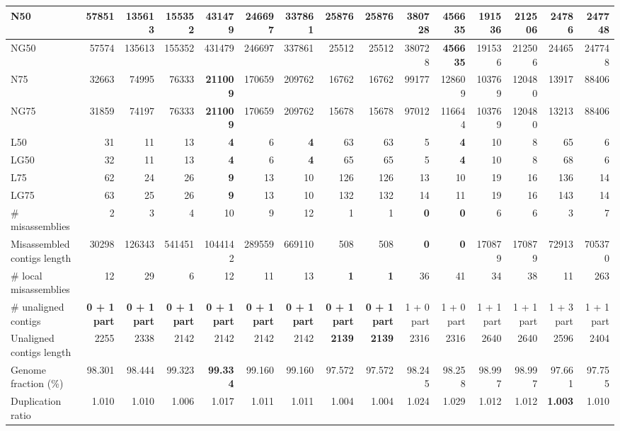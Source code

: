\documentclass[12pt,a4paper]{article}
\begin{document}
\begin{table}[ht]
\begin{center}
\begin{tabular}{|l*{14}{|r}|}
N50 & 57851 & 135613 & 155352 & 431479 & 246697 & 337861 & 25876 & 25876 & 380728 & {\bf 456635} & 191536 & 212506 & 24786 & 247748 \\ \hline
NG50 & 57574 & 135613 & 155352 & 431479 & 246697 & 337861 & 25512 & 25512 & 380728 & {\bf 456635} & 191536 & 212506 & 24465 & 247748 \\ \hline
N75 & 32663 & 74995 & 76333 & {\bf 211009} & 170659 & 209762 & 16762 & 16762 & 99177 & 128609 & 103769 & 120480 & 13917 & 88406 \\ \hline
NG75 & 31859 & 74197 & 76333 & {\bf 211009} & 170659 & 209762 & 15678 & 15678 & 97012 & 116644 & 103769 & 120480 & 13213 & 88406 \\ \hline
L50 & 31 & 11 & 13 & {\bf 4} & 6 & {\bf 4} & 63 & 63 & 5 & {\bf 4} & 10 & 8 & 65 & 6 \\ \hline
LG50 & 32 & 11 & 13 & {\bf 4} & 6 & {\bf 4} & 65 & 65 & 5 & {\bf 4} & 10 & 8 & 68 & 6 \\ \hline
L75 & 62 & 24 & 26 & {\bf 9} & 13 & 10 & 126 & 126 & 13 & 10 & 19 & 16 & 136 & 14 \\ \hline
LG75 & 63 & 25 & 26 & {\bf 9} & 13 & 10 & 132 & 132 & 14 & 11 & 19 & 16 & 143 & 14 \\ \hline
\# misassemblies & 2 & 3 & 4 & 10 & 9 & 12 & 1 & 1 & {\bf 0} & {\bf 0} & 6 & 6 & 3 & 7 \\ \hline
Misassembled contigs length & 30298 & 126343 & 541451 & 1044142 & 289559 & 669110 & 508 & 508 & {\bf 0} & {\bf 0} & 170879 & 170879 & 72913 & 705370 \\ \hline
\# local misassemblies & 12 & 29 & 6 & 12 & 11 & 13 & {\bf 1} & {\bf 1} & 36 & 41 & 34 & 38 & 11 & 263 \\ \hline
\# unaligned contigs & {\bf 0 + 1 part} & {\bf 0 + 1 part} & {\bf 0 + 1 part} & {\bf 0 + 1 part} & {\bf 0 + 1 part} & {\bf 0 + 1 part} & {\bf 0 + 1 part} & {\bf 0 + 1 part} & 1 + 0 part & 1 + 0 part & 1 + 1 part & 1 + 1 part & 1 + 3 part & 1 + 1 part \\ \hline
Unaligned contigs length & 2255 & 2338 & 2142 & 2142 & 2142 & 2142 & {\bf 2139} & {\bf 2139} & 2316 & 2316 & 2640 & 2640 & 2596 & 2404 \\ \hline
Genome fraction (\%) & 98.301 & 98.444 & 99.323 & {\bf 99.334} & 99.160 & 99.160 & 97.572 & 97.572 & 98.245 & 98.258 & 98.997 & 98.997 & 97.661 & 97.755 \\ \hline
Duplication ratio & 1.010 & 1.010 & 1.006 & 1.017 & 1.011 & 1.011 & 1.004 & 1.004 & 1.024 & 1.029 & 1.012 & 1.012 & {\bf 1.003} & 1.010 \\ \hline

\end{tabular}
\end{center}
\end{table}
\end{document}
